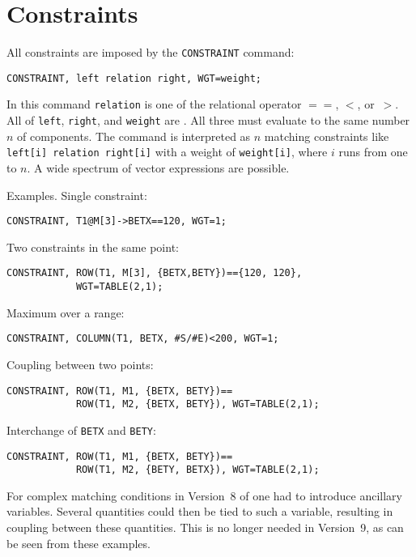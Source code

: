 \section{Constraints}
\label{sec:constraint}
All constraints are imposed by the \texttt{CONSTRAINT} command:
\begin{verbatim}
CONSTRAINT, left relation right, WGT=weight;
\end{verbatim}
In this command \texttt{relation} is one of the relational operator
$==$, $<$, or~$>$. 
All of \texttt{left}, \texttt{right}, and \texttt{weight}
are .
All three must evaluate to the same number $n$ of components.
The command is interpreted as $n$ matching constraints like
\texttt{left[i] relation right[i]} with a weight of
\texttt{weight[i]}, where $i$ runs from one to $n$.
A wide spectrum of vector expressions are possible.

Examples. Single constraint:
\begin{verbatim}
CONSTRAINT, T1@M[3]->BETX==120, WGT=1;
\end{verbatim} 
Two constraints in the same point:
\begin{verbatim}
CONSTRAINT, ROW(T1, M[3], {BETX,BETY})=={120, 120}, 
            WGT=TABLE(2,1);
\end{verbatim} 
Maximum over a range:
\begin{verbatim}
CONSTRAINT, COLUMN(T1, BETX, #S/#E)<200, WGT=1;
\end{verbatim} 
Coupling between two points:
\begin{verbatim}
CONSTRAINT, ROW(T1, M1, {BETX, BETY})==
            ROW(T1, M2, {BETX, BETY}), WGT=TABLE(2,1);
\end{verbatim} 
Interchange of \texttt{BETX} and \texttt{BETY}:
\begin{verbatim}
CONSTRAINT, ROW(T1, M1, {BETX, BETY})==
            ROW(T1, M2, {BETY, BETX}), WGT=TABLE(2,1);
\end{verbatim} 

For complex matching conditions in Version~8 of \opal one had to
introduce ancillary variables.
Several quantities could then be tied to such a variable,
resulting in coupling between these quantities.
This is no longer needed in Version~9, as can be seen from these
examples. 

